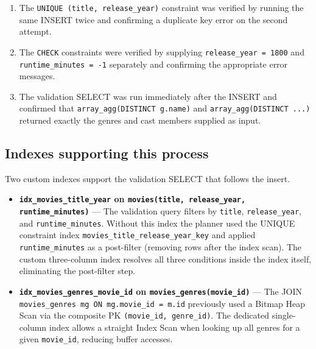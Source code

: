 \documentclass[11pt, a4paper]{article}
\begin{document}
\begin{enumerate}
    \item The \texttt{UNIQUE (title, release\_year)} constraint was verified
    by running the same INSERT twice and confirming a duplicate key error on
    the second attempt.
    \item The \texttt{CHECK} constraints were verified by supplying
    \texttt{release\_year = 1800} and \texttt{runtime\_minutes = -1}
    separately and confirming the appropriate error messages.
    \item The validation SELECT was run immediately after the INSERT and
    confirmed that \texttt{array\_agg(DISTINCT g.name)} and
    \texttt{array\_agg(DISTINCT ...)} returned exactly the genres and cast
    members supplied as input.
\end{enumerate}

\subsection{Indexes supporting this process}

Two custom indexes support the validation SELECT that follows the insert.

\begin{itemize}
    \item \textbf{\texttt{idx\_movies\_title\_year} on
    \texttt{movies(title, release\_year, runtime\_minutes)}} ---
    The validation query filters by \texttt{title}, \texttt{release\_year},
    and \texttt{runtime\_minutes}. Without this index the planner used the
    UNIQUE constraint index \texttt{movies\_title\_release\_year\_key} and
    applied \texttt{runtime\_minutes} as a post-filter (removing rows after
    the index scan). The custom three-column index resolves all three
    conditions inside the index itself, eliminating the post-filter step.

    \item \textbf{\texttt{idx\_movies\_genres\_movie\_id} on
    \texttt{movies\_genres(movie\_id)}} ---
    The JOIN \texttt{movies\_genres mg ON mg.movie\_id = m.id} previously
    used a Bitmap Heap Scan via the composite PK
    \texttt{(movie\_id, genre\_id)}. The dedicated single-column index
    allows a straight Index Scan when looking up all genres for a given
    \texttt{movie\_id}, reducing buffer accesses.
\end{itemize}

\newpage
\end{document}
